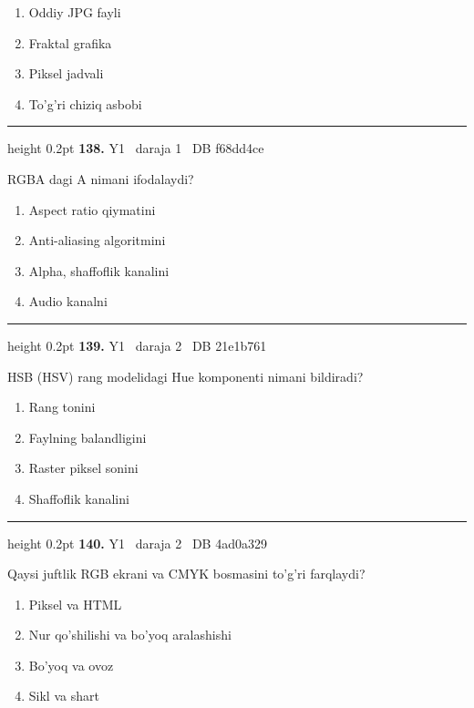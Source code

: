 \documentclass[10pt,a4paper,oneside]{article}
\begin{document}
\begin{enumerate}[label=\Alph*),leftmargin=9mm]
\item Oddiy JPG fayli
\item Fraktal grafika
\item Piksel jadvali
\item To'g'ri chiziq asbobi
\end{enumerate}
\vspace{2mm}\hrule height 0.2pt \vspace{4mm}
\hypertarget{q138}{\textbf{\color{ink}138.}}  {\color{muted}\scriptsize Y1 \textbullet\ daraja 1 \textbullet\ DB f68dd4ce}
\par
RGBA dagi A nimani ifodalaydi?
\begin{enumerate}[label=\Alph*),leftmargin=9mm]
\item Aspect ratio qiymatini
\item Anti-aliasing algoritmini
\item Alpha, shaffoflik kanalini
\item Audio kanalni
\end{enumerate}
\vspace{2mm}\hrule height 0.2pt \vspace{4mm}
\hypertarget{q139}{\textbf{\color{ink}139.}}  {\color{muted}\scriptsize Y1 \textbullet\ daraja 2 \textbullet\ DB 21e1b761}
\par
HSB (HSV) rang modelidagi Hue komponenti nimani bildiradi?
\begin{enumerate}[label=\Alph*),leftmargin=9mm]
\item Rang tonini
\item Faylning balandligini
\item Raster piksel sonini
\item Shaffoflik kanalini
\end{enumerate}
\vspace{2mm}\hrule height 0.2pt \vspace{4mm}
\hypertarget{q140}{\textbf{\color{ink}140.}}  {\color{muted}\scriptsize Y1 \textbullet\ daraja 2 \textbullet\ DB 4ad0a329}
\par
Qaysi juftlik RGB ekrani va CMYK bosmasini to'g'ri farqlaydi?
\begin{enumerate}[label=\Alph*),leftmargin=9mm]
\item Piksel va HTML
\item Nur qo'shilishi va bo'yoq aralashishi
\item Bo'yoq va ovoz
\item Sikl va shart
\end{enumerate}
\end{document}
